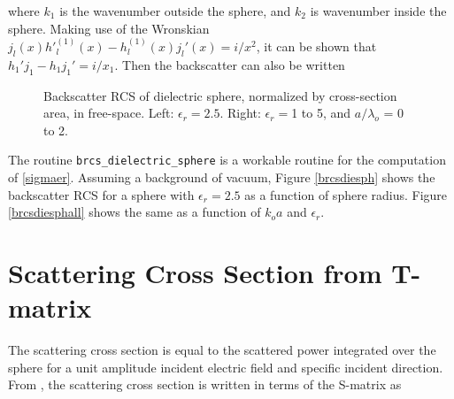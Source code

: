\noindent where $k_1$ is the wavenumber outside the sphere, and $k_2$ is wavenumber inside the sphere.  Making use of the Wronskian $j_l(x) {h'}_l^{(1)}(x) - h_l^{(1)}(x) j_l'(x) = i/x^2$, it can be shown that $h_1' j_1 - h_1 j_1'  = i/x_1$.  Then the backscatter can also be written 

\clearpage
\begin{figure}[h] 
   \centering
   \caption{Backscatter RCS of dielectric sphere, normalized by cross-section area, in free-space. Left: $\epsilon_r = 2.5$. Right: $\epsilon_r =$1 to 5, and $a/\lambda_o$ = 0 to 2.}
 \end{figure}
 
 
%

The routine \texttt{brcs\_dielectric\_sphere} is a workable routine for the computation of \eqref{sigmaer}.  Assuming a background of vacuum, Figure \ref{brcsdiesph} shows the backscatter RCS for a sphere with $\epsilon_r = 2.5$ as a function of sphere radius. Figure \ref{brcsdiesphall} shows the same as a function of $k_o a$ and $\epsilon_r$. 

{\footnotesize
{}
}

\clearpage
\section{Scattering Cross Section from T-matrix}

The scattering cross section is equal to the scattered power integrated over the sphere for a unit amplitude incident electric field and specific incident direction. From \cite{tsang1985theory}, the scattering cross section is written in terms of the S-matrix as 

